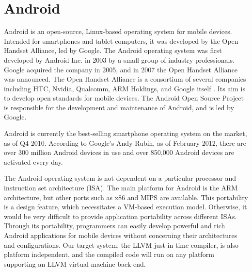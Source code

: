 \section{Android}
\label{sec:android}

Android is an open-source, Linux-based operating system for mobile devices. Intended for smartphones and tablet computers, it was developed by the Open Handset Alliance, led by Google. The Android operating system was first developed by Android Inc. in 2003 by a small group of industry professionals. Google acquired the company in 2005, and in 2007 the Open Handset Alliance was announced. The Open Handset Alliance is a consortium of several companies including HTC, Nvidia, Qualcomm, ARM Holdings, and Google itself \cite{oha_members}. Its aim is to develop open standards for mobile devices. The Android Open Source Project is responsible for the development and maintenance of Android, and is led by Google.

Android is currently the best-selling smartphone operating system on the market, as of Q4 2010\cite{android_top}. According to Google's Andy Rubin, as of February 2012, there are over 300 million Android devices in use and over 850,000 Android devices are activated every day\footnotemark {}.

The Android operating system is not dependent on a particular processor and instruction set architecture (ISA). The main platform for Android is the ARM architecture, but other ports such as x86 and MIPS are available. This portability is a design feature, which necessitates a VM-based execution model. Otherwise, it would be very difficult to provide application portability across different ISAs. Through its portability, programmers can easily develop powerful and rich Android applications for mobile devices without concerning their architectures and configurations. Our target system, the LLVM just-in-time compiler, is also platform independent, and the compiled code will run on any platform supporting an LLVM virtual machine back-end.
